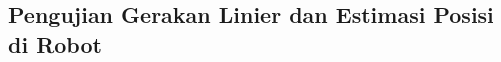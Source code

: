 \subsection{Pengujian Gerakan Linier dan Estimasi Posisi di Robot}
\label{subsec:linierrobot}

\textcolor{red}{\lipsum[1-2]}
